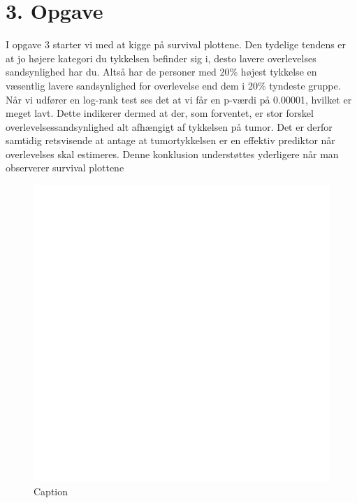 \chapter{3. Opgave}
I opgave 3 starter vi med at kigge på survival plottene. Den tydelige tendens er at jo højere kategori du tykkelsen befinder sig i, desto lavere overlevelses sandsynlighed har du. Altså har de personer med 20\% højest tykkelse en væsentlig lavere sandsynlighed for overlevelse end dem i 20\% tyndeste gruppe.\\
Når vi udfører en log-rank test ses det at vi får en p-værdi på 0.00001, hvilket er meget lavt. Dette indikerer dermed at der, som forventet, er stor forskel overlevelsessandsynlighed alt afhængigt af tykkelsen på tumor. Det er derfor samtidig retsvisende at antage at tumortykkelsen er en effektiv prediktor når overlevelses skal estimeres. Denne konklusion understøttes yderligere når man observerer survival plottene
\begin{figure}[h]
    \centering
    \includegraphics[width=0.7\linewidth]{Basses_kode/Billeder_duration/Kaplan-Meier_Survival_Curves_by_Tumor_Thickness_Categories.pdf}
    \caption{Caption}
    \label{fig:enter-label}
\end{figure}


